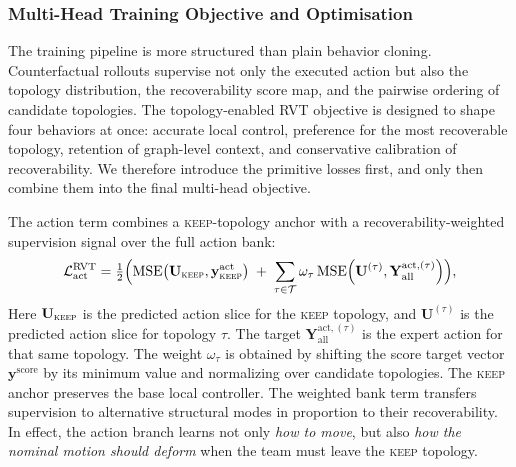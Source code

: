 \documentclass{ieeeaccess}
\newcommand{\cT}{\mathcal{T}}
\begin{document}
\subsubsection{Multi-Head Training Objective and Optimisation}
The training pipeline is more structured than plain behavior cloning.
Counterfactual rollouts supervise not only the executed action but also
the topology distribution, the recoverability score map, and the
pairwise ordering of candidate topologies. The topology-enabled RVT
objective is designed to shape four behaviors at once: accurate local
control, preference for the most recoverable topology, retention of
graph-level context, and conservative calibration of recoverability. We
therefore introduce the primitive losses first, and only then combine
them into the final multi-head objective.

The action term combines a \textsc{keep}-topology anchor with a recoverability-weighted supervision signal over the full action bank:
\begingroup
\footnotesize
\begin{equation}
\mathcal{L}^{\mathrm{RVT}}_{\mathrm{act}}
= \tfrac{1}{2}\Bigl(
\mathrm{MSE}\!\left(\mathbf{U}_{\textsc{keep}},
\mathbf{y}^{\mathrm{act}}_{\textsc{keep}}\right)
\;+\;
\sum_{\tau\in\cT}\omega_\tau\,
\mathrm{MSE}\!\left(\mathbf{U}^{(\tau)},
\mathbf{Y}^{\mathrm{act},(\tau)}_{\mathrm{all}}\right)
\Bigr),
\label{eq:loss_action}
\end{equation}
\endgroup
Here $\mathbf{U}_{\textsc{keep}}$ is the predicted action slice for the
\textsc{keep} topology, and $\mathbf{U}^{(\tau)}$ is the predicted
action slice for topology $\tau$. The target
$\mathbf{Y}^{\mathrm{act},(\tau)}_{\mathrm{all}}$ is the expert action
for that same topology. The weight $\omega_\tau$ is obtained by
shifting the score target vector $\mathbf{y}^{\mathrm{score}}$ by its
minimum value and normalizing over candidate topologies. The
\textsc{keep} anchor preserves the base local controller. The weighted
bank term transfers supervision to alternative structural modes in
proportion to their recoverability. In effect, the action branch learns
not only \emph{how to move}, but also \emph{how the nominal motion
should deform} when the team must leave the \textsc{keep} topology.
\end{document}
